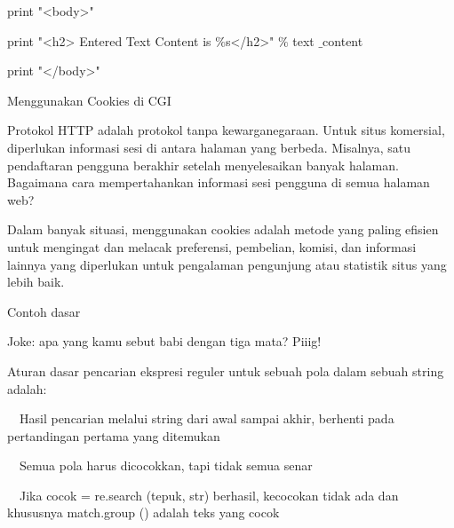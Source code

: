 \documentclass[a4paper,12pt]{report}
\begin{document}
\noindent 
print "<body>" \par
\noindent 
print "<h2> Entered Text Content is  $  \%  $s</h2>"  $  \%  $ text $  \_  $content \par
\noindent 
print "</body>" \par
\vspace{12pt}
\noindent 
Menggunakan Cookies di CGI \par
\vspace{12pt}
\noindent 
Protokol HTTP adalah protokol tanpa kewarganegaraan. Untuk situs komersial, diperlukan informasi sesi di antara halaman yang berbeda. Misalnya, satu pendaftaran pengguna berakhir setelah menyelesaikan banyak halaman. Bagaimana cara mempertahankan informasi sesi pengguna di semua halaman web? \par
\vspace{12pt}
\noindent 
Dalam banyak situasi, menggunakan cookies adalah metode yang paling efisien untuk mengingat dan melacak preferensi, pembelian, komisi, dan informasi lainnya yang diperlukan untuk pengalaman pengunjung atau statistik situs yang lebih baik. \par
\vspace{12pt}
\vspace{12pt}
\noindent 
Contoh dasar \par
\noindent 
\vspace{12pt}
\noindent 
Joke: apa yang kamu sebut babi dengan tiga mata? Piiig! \par
\noindent 
\vspace{12pt}
\noindent 
Aturan dasar pencarian ekspresi reguler untuk sebuah pola dalam sebuah string adalah: \par
\noindent 
\vspace{12pt}
\noindent 
 $  $ $  $ $  $ $  $Hasil pencarian melalui string dari awal sampai akhir, berhenti pada pertandingan pertama yang ditemukan \par
\noindent 
 $  $ $  $ $  $ $  $Semua pola harus dicocokkan, tapi tidak semua senar \par
\noindent 
 $  $ $  $ $  $ $  $Jika cocok = re.search (tepuk, str) berhasil, kecocokan tidak ada dan khususnya match.group () adalah teks yang cocok \par
\vspace{12pt}
\noindent 
\end{document}
